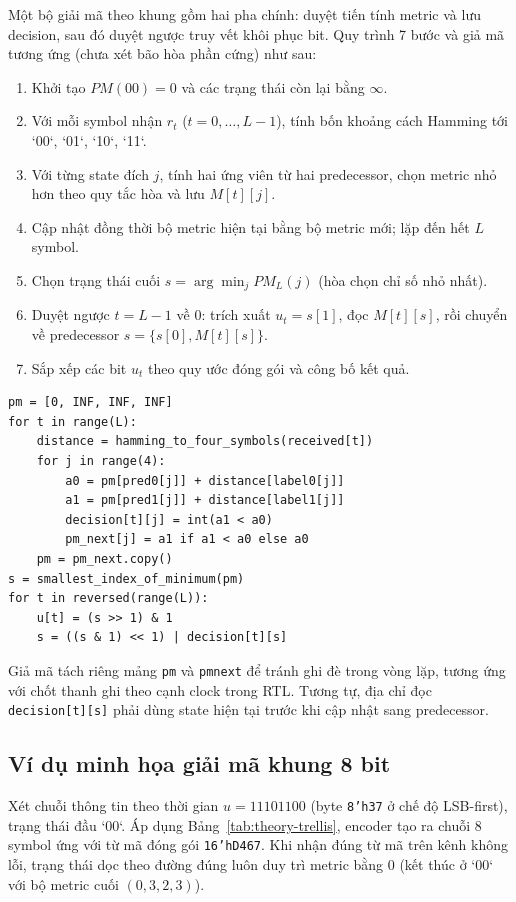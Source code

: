 \documentclass[12pt,a4paper]{article}
\DeclareRobustCommand{\code}[1]{\texttt{#1}}
\renewcommand{\_}{\originalunderscore\allowbreak}
\begin{document}
Một bộ giải mã theo khung gồm hai pha chính: duyệt tiến tính metric và lưu decision, sau đó duyệt ngược truy vết khôi phục bit. Quy trình 7 bước và giả mã tương ứng (chưa xét bão hòa phần cứng) như sau:
\begin{enumerate}[leftmargin=1.8em,itemsep=3pt]
\item Khởi tạo $PM(00)=0$ và các trạng thái còn lại bằng $\infty$.
\item Với mỗi symbol nhận $r_t$ ($t=0,\ldots,L-1$), tính bốn khoảng cách Hamming tới `00`, `01`, `10`, `11`.
\item Với từng state đích $j$, tính hai ứng viên từ hai predecessor, chọn metric nhỏ hơn theo quy tắc hòa và lưu $M[t][j]$.
\item Cập nhật đồng thời bộ metric hiện tại bằng bộ metric mới; lặp đến hết $L$ symbol.
\item Chọn trạng thái cuối $s=\arg\min_j PM_L(j)$ (hòa chọn chỉ số nhỏ nhất).
\item Duyệt ngược $t=L-1$ về $0$: trích xuất $u_t=s[1]$, đọc $M[t][s]$, rồi chuyển về predecessor $s=\{s[0], M[t][s]\}$.
\item Sắp xếp các bit $u_t$ theo quy ước đóng gói và công bố kết quả.
\end{enumerate}
{\small
\begin{verbatim}
pm = [0, INF, INF, INF]
for t in range(L):
    distance = hamming_to_four_symbols(received[t])
    for j in range(4):
        a0 = pm[pred0[j]] + distance[label0[j]]
        a1 = pm[pred1[j]] + distance[label1[j]]
        decision[t][j] = int(a1 < a0)
        pm_next[j] = a1 if a1 < a0 else a0
    pm = pm_next.copy()
s = smallest_index_of_minimum(pm)
for t in reversed(range(L)):
    u[t] = (s >> 1) & 1
    s = ((s & 1) << 1) | decision[t][s]
\end{verbatim}
}
Giả mã tách riêng mảng \code{pm} và \code{pm\_next} để tránh ghi đè trong vòng lặp, tương ứng với chốt thanh ghi theo cạnh clock trong RTL. Tương tự, địa chỉ đọc \code{decision[t][s]} phải dùng state hiện tại trước khi cập nhật sang predecessor.

\subsection{Ví dụ minh họa giải mã khung 8 bit}
Xét chuỗi thông tin theo thời gian $u=11101100$ (byte \code{8'h37} ở chế độ LSB-first), trạng thái đầu `00`. Áp dụng Bảng~\ref{tab:theory-trellis}, encoder tạo ra chuỗi 8 symbol ứng với từ mã đóng gói \code{16'hD467}. Khi nhận đúng từ mã trên kênh không lỗi, trạng thái dọc theo đường đúng luôn duy trì metric bằng 0 (kết thúc ở `00` với bộ metric cuối $(0,3,2,3)$).
\end{document}
